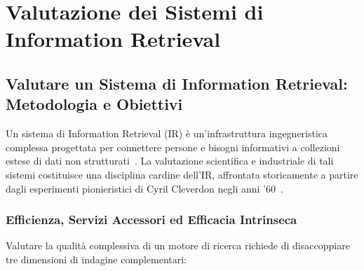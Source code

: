 \chapter{Valutazione dei Sistemi di Information Retrieval}
\label{chap:evaluation}

\FloatBarrier
\section{Valutare un Sistema di Information Retrieval: Metodologia e Obiettivi}
\label{sec:metodologia-obiettivi-valutazione}

Un sistema di Information Retrieval (IR) \`e un'infrastruttura ingegneristica complessa progettata per connettere persone e bisogni informativi a collezioni estese di dati non strutturati~\cite{manning2008,buttcher2010}. La valutazione scientifica e industriale di tali sistemi costituisce una disciplina cardine dell'IR, affrontata storicamente a partire dagli esperimenti pionieristici di Cyril Cleverdon negli anni '60~\cite{cleverdon1967}.

\FloatBarrier
\subsection{Efficienza, Servizi Accessori ed Efficacia Intrinseca}
\label{subsec:tre-dimensioni-valutazione}

Valutare la qualit\`a complessiva di un motore di ricerca richiede di disaccoppiare tre dimensioni di indagine complementari:

